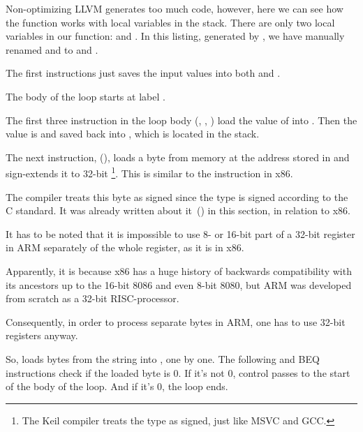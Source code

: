 ﻿

\myparagraphold{\NonOptimizingXcodeIV (\ARMMode)}



Non-optimizing LLVM generates too much code, however, here we can see how the function works with 
local variables in the stack.
There are only two local variables in our function:  and .
In this listing, generated by \IDA, we have manually renamed  and  to  and .

The first instructions just saves the input values into both  and .

The body of the loop starts at label .

The first three instruction in the loop body (, \ADD, ) load the value of  into . 
Then the value is  and saved back into , which is located in the stack.

The next instruction,   (), loads a byte from memory at the address stored in  and sign-extends it to 32-bit
\footnote{The Keil compiler treats the \Tchar type as signed, just like MSVC and GCC.}.
This is similar to the \MOVSX instruction in x86.

The compiler treats this byte as signed since the \Tchar type is signed according to the C standard.
It was already written about it~() in this section, in relation to x86.


It has to be noted that it is impossible to use 8- or 16-bit part 
of a 32-bit register in ARM separately of the whole register,
as it is in x86.

Apparently, it is because x86 has a huge history of backwards compatibility with its ancestors 
up to the 16-bit 8086 and even 8-bit 8080,
but ARM was developed from scratch as a 32-bit RISC-processor.

Consequently, in order to process separate bytes in ARM, one has to use 32-bit registers anyway.

So,  loads bytes from the string into , one by one.
The following \CMP and \ac{BEQ} instructions check if the loaded byte is 0.
If it's not 0, control passes to the start of the body of the loop.
And if it's 0, the loop ends.

